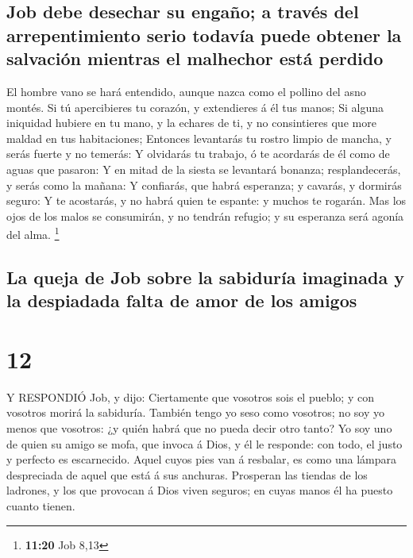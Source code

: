 \hypertarget{job-debe-desechar-su-engauxf1o-a-travuxe9s-del-arrepentimiento-serio-todavuxeda-puede-obtener-la-salvaciuxf3n-mientras-el-malhechor-estuxe1-perdido}{%
\subsection{Job debe desechar su engaño; a través del arrepentimiento
serio todavía puede obtener la salvación mientras el malhechor está
perdido}\label{job-debe-desechar-su-engauxf1o-a-travuxe9s-del-arrepentimiento-serio-todavuxeda-puede-obtener-la-salvaciuxf3n-mientras-el-malhechor-estuxe1-perdido}}

 El hombre vano se hará entendido, aunque nazca como el
pollino del asno montés.  Si tú apercibieres tu corazón, y
extendieres á él tus manos;  Si alguna iniquidad hubiere en
tu mano, y la echares de ti, y no consintieres que more maldad en tus
habitaciones;  Entonces levantarás tu rostro limpio de
mancha, y serás fuerte y no temerás:  Y olvidarás tu
trabajo, ó te acordarás de él como de aguas que pasaron:  Y
en mitad de la siesta se levantará bonanza; resplandecerás, y serás como
la mañana:  Y confiarás, que habrá esperanza; y cavarás, y
dormirás seguro:  Y te acostarás, y no habrá quien te
espante: y muchos te rogarán.  Mas los ojos de los malos se
consumirán, y no tendrán refugio; y su esperanza será agonía del alma.
\footnote{\textbf{11:20} Job 8,13}

\hypertarget{la-queja-de-job-sobre-la-sabiduruxeda-imaginada-y-la-despiadada-falta-de-amor-de-los-amigos}{%
\subsection{La queja de Job sobre la sabiduría imaginada y la despiadada
falta de amor de los
amigos}\label{la-queja-de-job-sobre-la-sabiduruxeda-imaginada-y-la-despiadada-falta-de-amor-de-los-amigos}}

\hypertarget{section-11}{%
\section{12}\label{section-11}}

 Y RESPONDIÓ Job, y dijo:  Ciertamente que
vosotros sois el pueblo; y con vosotros morirá la sabiduría.
 También tengo yo seso como vosotros; no soy yo menos que
vosotros: ¿y quién habrá que no pueda decir otro tanto?  Yo
soy uno de quien su amigo se mofa, que invoca á Dios, y él le responde:
con todo, el justo y perfecto es escarnecido.  Aquel cuyos
pies van á resbalar, es como una lámpara despreciada de aquel que está á
sus anchuras.  Prosperan las tiendas de los ladrones, y los
que provocan á Dios viven seguros; en cuyas manos él ha puesto cuanto
tienen.

